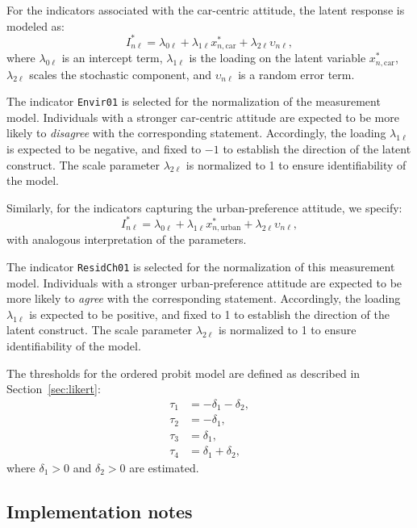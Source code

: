 \documentclass[12pt,a4paper]{article}
\begin{document}
For the indicators associated with the car-centric attitude, the latent response is modeled as:
\begin{equation}
  I^*_{n\ell} = \lambda_{0\ell} + \lambda_{1\ell} x^*_{n,\text{car}} + \lambda_{2\ell} \upsilon_{n\ell},
\end{equation}
where \( \lambda_{0\ell} \) is an intercept term, \( \lambda_{1\ell} \) is the loading on the latent variable \( x^*_{n,\text{car}} \), \( \lambda_{2\ell} \) scales the stochastic component, and \( \upsilon_{n\ell} \) is a random error term.

The indicator \texttt{Envir01} is selected for the normalization of
the measurement model. Individuals with a stronger car-centric
attitude are expected to be more likely to \emph{disagree} with the
corresponding statement. Accordingly, the loading \( \lambda_{1\ell}
\) is expected to be negative, and fixed to \(-1\) to establish the direction of the latent
construct. The scale parameter \( \lambda_{2\ell} \) is normalized to
1 to ensure identifiability of the model.

Similarly, for the indicators capturing the urban-preference attitude, we specify:
\begin{equation}
  I^*_{n\ell} = \lambda_{0\ell} + \lambda_{1\ell} x^*_{n,\text{urban}} + \lambda_{2\ell} \upsilon_{n\ell},
\end{equation}
with analogous interpretation of the parameters.

The indicator \texttt{ResidCh01} is selected for the normalization of
this measurement model. Individuals with a stronger urban-preference
attitude are expected to be more likely to \emph{agree} with the
corresponding statement. Accordingly, the loading \( \lambda_{1\ell}
\) is expected to be positive, and fixed to 1 to establish the
direction of the latent construct. The scale parameter \(
\lambda_{2\ell} \) is normalized to 1 to ensure identifiability of the
model.

The thresholds for the ordered probit model are defined as described in Section~\ref{sec:likert}:
\[
\begin{aligned}
  \tau_1 &= -\delta_1 - \delta_2, \\
  \tau_2 &= -\delta_1, \\
  \tau_3 &= \delta_1, \\
  \tau_4 &= \delta_1 + \delta_2,
\end{aligned}
\]
where \( \delta_1 > 0 \) and \( \delta_2 > 0 \) are estimated.

\subsection{Implementation notes}
\end{document}

